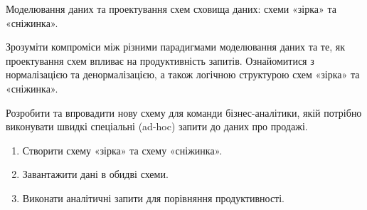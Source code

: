 


 Моделювання даних та проектування схем сховища даних: схеми «зірка» та «сніжинка».

 Зрозуміти компроміси між різними парадигмами моделювання даних та те, як проектування схем впливає на продуктивність запитів. Ознайомитися з нормалізацією та денормалізацією, а також логічною структурою схем «зірка» та «сніжинка».

 Розробити та впровадити нову схему для команди бізнес-аналітики, якій потрібно виконувати швидкі спеціальні (ad-hoc) запити до даних про продажі.

\begin{enumerate}
  \item Створити схему «зірка» та схему «сніжинка».
  \item Завантажити дані в обидві схеми.
  \item Виконати аналітичні запити для порівняння продуктивності.
\end{enumerate}

